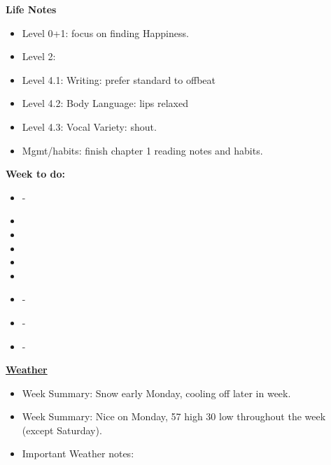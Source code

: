 \documentclass[serif, mathserif, final]{beamer}
\begin{document}
{            %
            \textbf{Life Notes}
            \begin{itemize}
              \tiny \item \tiny Level 0+1: focus on finding Happiness.
            \item \tiny Level 2:
            \item \tiny Level 4.1: Writing: prefer standard to offbeat
            \item \tiny Level 4.2: Body Language: lips relaxed
            \item \tiny Level 4.3: Vocal Variety: shout.
            \item \tiny Mgmt/habits: finish chapter 1 reading notes and habits.
            \end{itemize} 
            \newpage
            \textbf{Week to do:} 
            \begin{itemize}
              \small \item \small - 
            \item \small
            \item \small
            \item \small
            \item \small
            \item \small
            \item \small - 
            \item \small - 
            \item \small - 
            \end{itemize} 
            \newpage 
         
            \textbf{\small \underline{Weather}} 
            \begin{itemize} 
              \tiny \item \tiny Week Summary: Snow early Monday,
              cooling off later in week. 
              \tiny \item \tiny Week Summary: Nice on Monday, 57 high
              30 low throughout the week (except Saturday). 
            \item \tiny Important Weather notes:  
            \end{itemize} 

}
\end{document}
